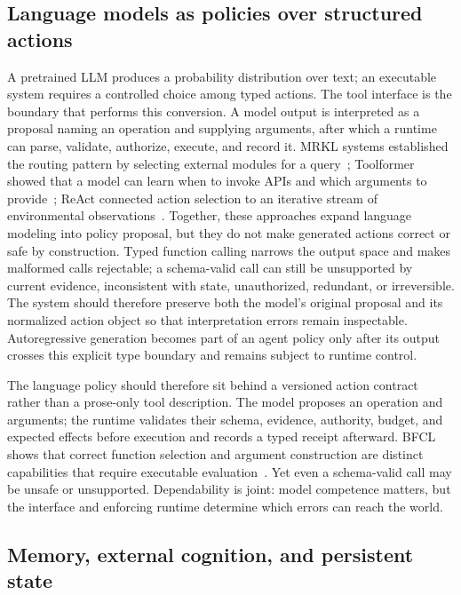 \subsection{Language models as policies over structured actions}

A pretrained LLM produces a probability distribution over text; an executable system requires a controlled choice among typed actions. The tool interface is the boundary that performs this conversion. A model output is interpreted as a proposal naming an operation and supplying arguments, after which a runtime can parse, validate, authorize, execute, and record it. MRKL systems established the routing pattern by selecting external modules for a query~\cite{karpas2022mrkl}; Toolformer showed that a model can learn when to invoke APIs and which arguments to provide~\cite{schick2023toolformer}; ReAct connected action selection to an iterative stream of environmental observations~\cite{yao2023react}. Together, these approaches expand language modeling into policy proposal, but they do not make generated actions correct or safe by construction. Typed function calling narrows the output space and makes malformed calls rejectable; a schema-valid call can still be unsupported by current evidence, inconsistent with state, unauthorized, redundant, or irreversible. The system should therefore preserve both the model's original proposal and its normalized action object so that interpretation errors remain inspectable. Autoregressive generation becomes part of an agent policy only after its output crosses this explicit type boundary and remains subject to runtime control.

The language policy should therefore sit behind a versioned action contract rather than a prose-only tool description. The model proposes an operation and arguments; the runtime validates their schema, evidence, authority, budget, and expected effects before execution and records a typed receipt afterward. BFCL shows that correct function selection and argument construction are distinct capabilities that require executable evaluation~\cite{patil2025bfcl}. Yet even a schema-valid call may be unsafe or unsupported. Dependability is joint: model competence matters, but the interface and enforcing runtime determine which errors can reach the world.

\subsection{Memory, external cognition, and persistent state}

